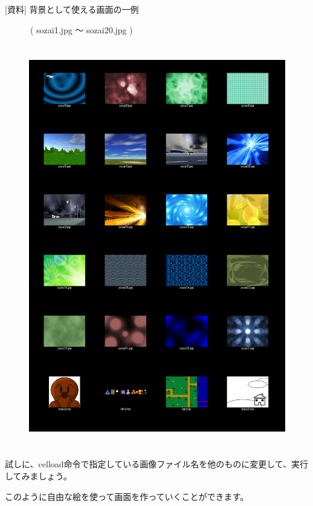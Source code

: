 [資料] 背景として使える画面の一例

　　　( sozai1.jpg 〜 sozai20.jpg )


\begin{figure}[H]
    \begin{center}
      \includegraphics[keepaspectratio,width=14.843cm,height=17.609cm]{text04-img/s_sozai.png}
    \end{center}
    \label{fig:prog_menu}
\end{figure}

試しに、celload命令で指定している画像ファイル名を他のものに変更して、実行してみましょう。

このように自由な絵を使って画面を作っていくことができます。


\begin{description}
    \item {}
\end{description}



